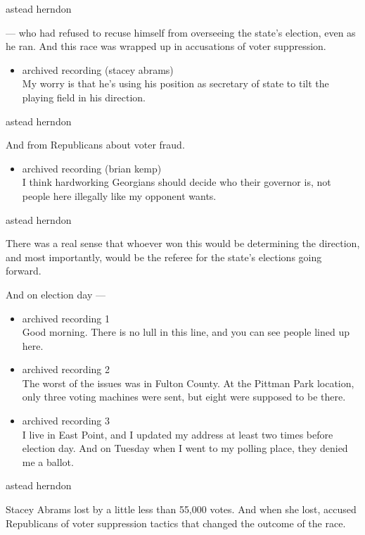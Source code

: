 astead herndon

--- who had refused to recuse himself from overseeing the state's
election, even as he ran. And this race was wrapped up in accusations of
voter suppression.

\begin{itemize}
\tightlist
\item
  archived recording (stacey abrams)\\
  My worry is that he's using his position as secretary of state to tilt
  the playing field in his direction.
\end{itemize}

astead herndon

And from Republicans about voter fraud.

\begin{itemize}
\tightlist
\item
  archived recording (brian kemp)\\
  I think hardworking Georgians should decide who their governor is, not
  people here illegally like my opponent wants.
\end{itemize}

astead herndon

There was a real sense that whoever won this would be determining the
direction, and most importantly, would be the referee for the state's
elections going forward.

And on election day ---

\begin{itemize}
\item
  archived recording 1\\
  Good morning. There is no lull in this line, and you can see people
  lined up here.
\item
  archived recording 2\\
  The worst of the issues was in Fulton County. At the Pittman Park
  location, only three voting machines were sent, but eight were
  supposed to be there.
\item
  archived recording 3\\
  I live in East Point, and I updated my address at least two times
  before election day. And on Tuesday when I went to my polling place,
  they denied me a ballot.
\end{itemize}

astead herndon

Stacey Abrams lost by a little less than 55,000 votes. And when she
lost, accused Republicans of voter suppression tactics that changed the
outcome of the race.

